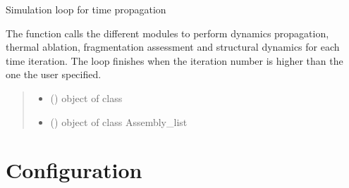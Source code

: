 \documentclass[letterpaper,10pt,english]{sphinxmanual}
\begin{document}
\begin{fulllineitems}
\label{\detokenize{modules:TITAN.loop}}
\pysigstartsignatures
{}
\pysigstopsignatures
\sphinxAtStartPar
Simulation loop for time propagation

\sphinxAtStartPar
The function calls the different modules to perform
dynamics propagation, thermal ablation, fragmentation
assessment and structural dynamics for each time iteration.
The loop finishes when the iteration number is higher than
the one the user specified.
\begin{quote}\begin{description}
\begin{itemize}
\item {} 
\sphinxAtStartPar
{} ({\hyperref[\detokenize{modules:configuration.Options}]{}}) \textendash{} object of class {\hyperref[\detokenize{modules:configuration.Options}]{}}

\item {} 
\sphinxAtStartPar
{} ({\hyperref[\detokenize{modules:assembly.Assembly_list}]{}}) \textendash{} object of class Assembly\_list

\end{itemize}

\end{description}\end{quote}

\end{fulllineitems}



\section{Configuration}
\label{\detokenize{modules:configuration}}
\end{document}
